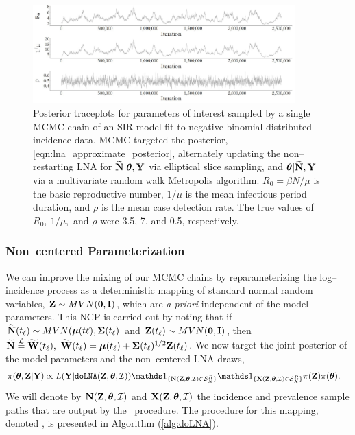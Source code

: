 \begin{figure}[!ht]
\centering
\includegraphics[width=0.9\textwidth]{figures/lna_centered_traces}
\caption{Posterior traceplots for parameters of interest sampled by a single MCMC chain of an SIR model fit to negative binomial distributed incidence data. MCMC targeted the posterior, \ref{eqn:lna_approximate_posterior}, alternately updating the non--restarting LNA for $ \widetilde{\mathbf{N}}|\boldsymbol{\theta},\mathbf{Y} $ via elliptical slice sampling, and $ \boldsymbol{\theta}|\widetilde{\mathbf{N}},\mathbf{Y} $ via a multivariate random walk Metropolis algorithm. $ R_0 = \beta N / \mu$ is the basic reproductive number, $ 1/\mu $ is the mean infectious period duration, and $ \rho $ is the mean case detection rate. The true values of $ R_0,\ 1/\mu,$ and $ \rho $ were 3.5, 7, and 0.5, respectively.}
\label{fig:lna_centered_traces}
\end{figure}

\subsubsection{Non--centered Parameterization}
\label{subsubsec:noncentered_parameterization}	

We can improve the mixing of our MCMC chains by reparameterizing the log--incidence process as a deterministic mapping of standard normal random variables, $ \mathbf{Z}\sim MVN(\boldsymbol{0},\mathbf{I}) $, which are \textit{a priori} independent of the model parameters. This NCP is carried out by noting that if $ \widetilde{\mathbf{N}}(t_\ell)\sim MVN(\boldsymbol{\mu}(t\ell),\boldsymbol{\Sigma}(t_\ell) $ and $ \mathbf{Z}(t_\ell)\sim MVN(\boldsymbol{0},\mathbf{I}) $, then $ \widetilde{\mathbf{N}} \overset{\mathcal{L}}{=}\widetilde{\mathbf{W}}(t_\ell),\ \widetilde{\mathbf{W}}(t_\ell) = \boldsymbol{\mu}(t_\ell) + \boldsymbol{\Sigma}(t_\ell)^{1/2}\mathbf{Z}(t_\ell) $. We now target the joint posterior of the model parameters and the non--centered LNA draws,
\begin{align}
\label{eqn:lna_noncentered_posterior}
\pi(\btheta,\bZ|\bY) &\propto L(\bY|\doLNA(\bZ,\btheta,\mcI))\ind{\bN(\bZ,\btheta,\mcI)\in\mcS_N^R}\ind{\bX(\bZ,\btheta,\mcI)\in\mcS_X^R}\pi(\bZ)\pi(\btheta).
\end{align}
We will denote by $ \mathbf{N}(\mathbf{Z},\boldsymbol{\theta},\mathcal{I}) $ and $ \mathbf{X}(\mathbf{Z},\boldsymbol{\theta},\mathcal{I}) $ the incidence and prevalence sample paths that are output by the \doLNA\ procedure. The procedure for this mapping, denoted \doLNA, is presented in Algorithm (\ref{alg:doLNA}). 

